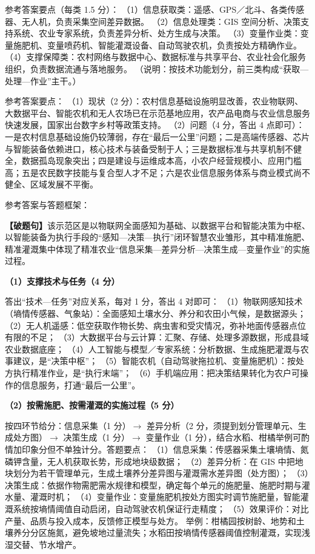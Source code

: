 \documentclass[a4paper,11pt]{article}
\begin{document}
\q 参考答案要点（每类 1.5 分）：
（1）信息获取类：遥感、GPS／北斗、各类传感器、无人机，负责采集空间差异数据。
（2）信息处理类：GIS 空间分析、决策支持系统、农业专家系统，负责差异分析、处方生成与决策。
（3）变量作业类：变量施肥机、变量喷药机、智能灌溉设备、自动驾驶农机，负责按处方精确作业。
（4）支撑保障类：农村网络与数据中心、数据标准与共享平台、农业社会化服务组织，负责数据流通与落地服务。
（说明：按技术功能划分，前三类构成“获取—处理—作业”主干。）

\q 参考答案要点：
（1）现状（2 分）：农村信息基础设施明显改善，农业物联网、大数据平台、智能农机和无人农场已在示范基地应用，农产品电商与农业信息服务快速发展，国家出台数字乡村等政策支持。
（2）问题（4 分，答出 4 点即可）：一是农村信息基础设施仍较薄弱，存在“最后一公里”问题；二是高端传感器、芯片与智能装备依赖进口，核心技术与装备受制于人；三是数据标准与共享机制不健全，数据孤岛现象突出；四是建设与运维成本高，小农户经营规模小、应用门槛高；五是农民数字技能与复合型人才不足；六是农业信息服务体系与商业模式尚不健全、区域发展不平衡。


\q 参考答案与答题框架：

\textbf{【破题句】}该示范区是以物联网全面感知为基础、以数据平台和智能决策为中枢、以智能装备为执行手段的“感知—决策—执行”闭环智慧农业雏形，其中精准施肥、精准灌溉集中体现了精准农业“信息采集—差异分析—决策生成—变量作业”的实施过程。

\textbf{（1）支撑技术与任务（4 分）}
\begin{analysis}
答出“技术—任务”对应关系，每对 1 分，答出 4 对即可：
（1）物联网感知技术（墒情传感器、气象站）：全面感知土壤水分、养分和农田小气候，是数据源头；
（2）无人机遥感：低空获取作物长势、病虫害和受灾情况，弥补地面传感器点位有限的不足；
（3）大数据平台与云计算：汇聚、存储、处理多源数据，形成县域农业数据底座；
（4）人工智能与模型／专家系统：分析数据、生成施肥灌溉与农事建议，是“决策中枢”；
（5）智能农机（自动驾驶拖拉机、变量施肥机）：按处方执行精准作业，是“执行末端”；
（6）手机端应用：把决策结果转化为农户可操作的信息服务，打通“最后一公里”。
\end{analysis}

\textbf{（2）按需施肥、按需灌溉的实施过程（5 分）}
\begin{analysis}
按四环节给分：信息采集（1 分）$\rightarrow$ 差异分析（2 分，须提到划分管理单元、生成处方图）$\rightarrow$ 决策生成（1 分）$\rightarrow$ 变量作业（1 分），结合水稻、柑橘举例可酌情加印象分但不单独计分。答题要点：
（1）信息采集：传感器采集土壤墒情、氮磷钾含量，无人机获取长势，形成地块级数据；
（2）差异分析：在 GIS 中把地块划分为若干管理单元，生成土壤养分差异图与灌溉需水差异图（处方图）；
（3）决策生成：依据作物需肥需水规律和模型，确定每个单元的施肥量、施肥时期与灌水量、灌溉时机；
（4）变量作业：变量施肥机按处方图实时调节施肥量，智能灌溉系统按墒情阈值自动启闭，自动驾驶农机保证行走精度；
（5）效果评价：对比产量、品质与投入成本，反馈修正模型与处方。
举例：柑橘园按树龄、地势和土壤养分分区施氮，避免坡地过量流失；水稻田按墒情传感器阈值控制灌溉，实现浅湿交替、节水增产。
\end{analysis}
\end{document}
